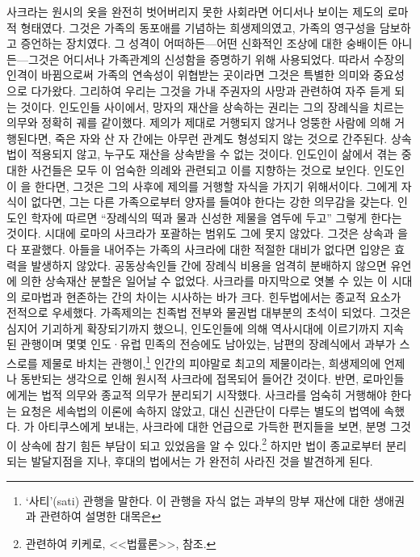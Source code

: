 사크라는 원시의 옷을 완전히 벗어버리지 못한 사회라면 어디서나 보이는
제도의 로마적 형태였다.
그것은 가족의 동포애를 기념하는 희생제의였고,
가족의 영구성을 담보하고 증언하는 장치였다.
그 성격이 어떠하든---어떤 신화적인 조상에 대한 숭배이든 아니든---그것은
어디서나 가족관계의 신성함을 증명하기 위해 사용되었다.
따라서 수장의 인격이 바뀜으로써 가족의 연속성이 위협받는 곳이라면
그것은 특별한 의미와 중요성으로 다가왔다.
그리하여 우리는 그것을 가내 주권자의 사망과 관련하여 자주 듣게 되는 것이다.
인도인들 사이에서, 망자의 재산을 상속하는 권리는 그의 장례식을 치르는 의무와
정확히 궤를 같이했다.
제의가 제대로 거행되지 않거나 엉뚱한 사람에 의해 거행된다면,
죽은 자와 산 자 간에는 아무런 관계도 형성되지 않는 것으로 간주된다.
상속법이 적용되지 않고, 누구도 재산을 상속받을 수 없는 것이다.
인도인이 삶에서 겪는 중대한 사건들은 모두 이 엄숙한 의례와 관련되고 이를
지향하는 것으로 보인다.
인도인이 을 한다면, 그것은
그의 사후에 제의를 거행할 자식을 가지기 위해서이다.
그에게 자식이 없다면,
그는 다른 가족으로부터 양자를 들여야 한다는 강한 의무감을 갖는다.
인도인 학자에 따르면 ``장례식의 떡과 물과 신성한 제물을 염두에 두고''
그렇게 한다는 것이다.
 시대에 로마의 사크라가 포괄하는 범위도 그에 못지 않았다.
그것은 상속과 을 다 포괄했다.
아들을 내어주는 가족의 사크라에 대한 적절한 대비가 없다면
입양은 효력을 발생하지 않았다.
공동상속인들 간에 장례식 비용을 엄격히 분배하지 않으면
유언에 의한 상속재산 분할은 일어날 수 없었다.
사크라를 마지막으로 엿볼 수 있는
이 시대의 로마법과 현존하는  간의 차이는
시사하는 바가 크다.
힌두법에서는 종교적 요소가 전적으로 우세했다.
가족제의는 친족법 전부와 물권법 대부분의 초석이 되었다.
그것은 심지어 기괴하게 확장되기까지 했으니,
인도인들에 의해 역사시대에 이르기까지 지속된 관행이며
몇몇 인도^^b7유럽 민족의 전승에도 남아있는,
남편의 장례식에서 과부가 스스로를 제물로 바치는 관행이,\footnote{%
  `사티'(sati) 관행을 말한다.
  이 관행을 자식 없는 과부의 망부 재산에 대한 생애권과 관련하여 설명한 대목은
  }
인간의 피야말로 최고의 제물이라는, 희생제의에 언제나 동반되는 생각으로 인해
원시적 사크라에 접목되어 들어간 것이다.
반면, 로마인들에게는 법적 의무와 종교적 의무가 분리되기 시작했다.
사크라를 엄숙히 거행해야 한다는 요청은 세속법의 이론에 속하지 않았고,
대신 신관단이 다루는
별도의 법역에 속했다.
가 아티쿠스에게 보내는,
사크라에 대한 언급으로 가득한
편지들을 보면, 분명 그것이 상속에 참기 힘든 부담이 되고 있었음을
알 수 있다.\footnote{%
  관련하여 키케로, <<법률론>>,  참조. }
하지만 법이 종교로부터 분리되는 발달지점을 지나,
후대의 법에서는 가 완전히 사라진 것을 발견하게 된다.

